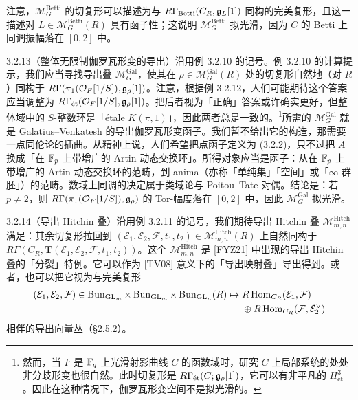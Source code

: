 注意，$\mathcal M^{\mathrm{Betti}}_G$ 的切复形可以描述为与 $R\Gamma_{\mathrm{Betti}}(C_R,\mathfrak{g}_L[1])$ 同构的完美复形，且这一描述对 $L\in\mathcal M^{\mathrm{Betti}}_G(R)$ 具有函子性；这说明 $\mathcal M^{\mathrm{Betti}}_G$ 拟光滑，因为 $C$ 的 Betti 上同调振幅落在 $[0,2]$ 中。

\begin{exam}{3.2.13}（整体无限制伽罗瓦形变的导出）沿用例 3.2.10 的记号。例 3.2.10 的计算提示，我们应当寻找导出叠 $\mathcal M^{\mathrm{Gal}}_G$，使其在 $\rho\in\mathcal M^{\mathrm{Gal}}_G(R)$ 处的切复形自然地（对 $R$）同构于 $R\Gamma(\pi_1(\mathcal O_F[1/S]),\mathfrak{g}_\rho[1])$。注意，根据例 3.2.12，人们可能期待这个答案应当调整为 $R\Gamma_{\text{ét}}(\mathcal O_F[1/S],\mathfrak{g}_\rho[1])$。把后者视为「正确」答案或许确实更好，但整体域中的 $S$-整数环是「étale $K(\pi,1)$」，因此两者总是一致的。\footnote{然而，当 $F$ 是 $\mathbb{F}_q$ 上光滑射影曲线 $C$ 的函数域时，研究 $C$ 上局部系统的处处非分歧形变也很自然。此时切复形是 $R\Gamma_{\text{ét}}(C;\mathfrak{g}_\rho[1])$，它可以有非平凡的 $H^3_{\text{ét}}$。因此在这种情况下，伽罗瓦形变空间不是拟光滑的。}所需的 $\mathcal M^{\mathrm{Gal}}_G$ 就是 Galatius–Venkatesh 的导出伽罗瓦形变函子。我们暂不给出它的构造，那需要一点同伦论的插曲。从精神上说，人们希望把点函子定义为 (3.2.2)，只不过把 $A$ 换成「在 $\mathbb{F}_p$ 上带增广的 Artin 动态交换环」。所得对象应当是函子：从在 $\mathbb{F}_p$ 上带增广的 Artin 动态交换环的范畴，到 anima（亦称「单纯集」「空间」或「$\infty$-群胚」）的范畴。数域上同调的决定属于类域论与 Poitou–Tate 对偶。结论是：若 $p\ne2$，则 $R\Gamma(\pi_1(\mathcal O_F[1/S]),\mathfrak{g}_\rho)$ 的 Tor-幅度落在 $[0,2]$ 中，因此 $\mathcal M^{\mathrm{Gal}}_G$ 拟光滑。
\end{exam}

\begin{exam}{3.2.14}（导出 Hitchin 叠）沿用例 3.2.11 的记号，我们期待导出 Hitchin 叠 $\mathcal M^{\mathrm{Hitch}}_{m,n}$ 满足：其余切复形拉回到 $(\mathcal E_1,\mathcal E_2,\mathcal F,t_1,t_2)\in\mathcal M^{\mathrm{Hitch}}_{m,n}(R)$ 上自然同构于 $R\Gamma(C_R,\mathbf T(\mathcal E_1,\mathcal E_2,\mathcal F,t_1,t_2))$。这个 $\mathcal M^{\mathrm{Hitch}}_{m,n}$ 是 [FYZ21] 中出现的导出 Hitchin 叠的「分裂」特例。它可以作为 [TV08] 意义下的「导出映射叠」导出得到。或者，也可以把它视为与完美复形
\[
\begin{aligned}
(\mathcal E_1,\mathcal E_2,\mathcal F)\in\operatorname{Bun}_{\mathrm{GL}_m}\times\operatorname{Bun}_{\mathrm{GL}_m}\times\operatorname{Bun}_{\mathrm{GL}_n}(R)
\mapsto{} & R\operatorname{Hom}_{C_R}(\mathcal E_1,\mathcal F)\\
&{}\oplus R\operatorname{Hom}_{C_R}(\mathcal F,\mathcal E_2^\vee)
\end{aligned}
\]
相伴的导出向量丛（§2.5.2）。
\end{exam}

